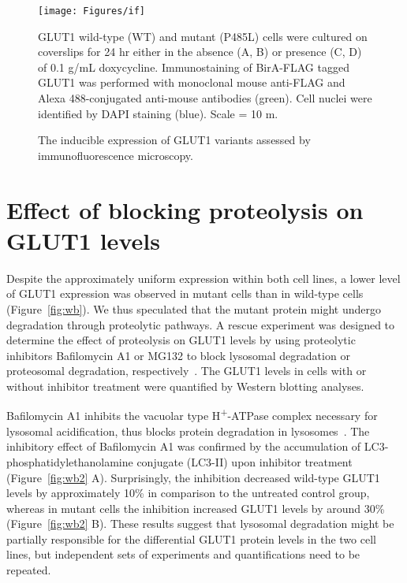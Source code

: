 \begin{figure}[h]
\centering
\texttt{[image: Figures/if]}
\caption{The inducible expression of GLUT1 variants assessed by immunofluorescence microscopy.}
\vspace*{-3mm}
\small \justify
GLUT1 wild-type (WT) and mutant (P485L) cells were cultured on coverslips for 24 hr either in the absence (A, B) or presence (C, D) of 0.1 {}\textmu g/mL doxycycline. Immunostaining of BirA-FLAG tagged GLUT1 was performed with monoclonal mouse anti-FLAG and Alexa 488-conjugated anti-mouse antibodies (green). Cell nuclei were identified by DAPI staining (blue). Scale = 10 \textmu m.
\label{fig:if}
\end{figure}

\section{Effect of blocking proteolysis on GLUT1 levels}
Despite the approximately uniform expression within both cell lines, a lower level of GLUT1 expression was observed in mutant cells than in wild-type cells (Figure~\ref{fig:wb}). We thus speculated that the mutant protein might undergo degradation through proteolytic pathways. A rescue experiment was designed to determine the effect of proteolysis on GLUT1 levels by using proteolytic inhibitors Bafilomycin A1 or MG132 to block lysosomal degradation or proteosomal degradation, respectively~\cite{Tanida,Lee.2}. The GLUT1 levels in cells with or without inhibitor treatment were quantified by Western blotting analyses.

Bafilomycin A1 inhibits the vacuolar type H\textsuperscript{+}-ATPase complex necessary for lysosomal acidification, thus blocks protein degradation in lysosomes~\cite{Yamamoto,Klionsky}. The inhibitory effect of Bafilomycin A1 was confirmed by the accumulation of LC3-phosphatidylethanolamine conjugate (LC3-II) upon inhibitor treatment (Figure~\ref{fig:wb2} A). Surprisingly, the inhibition decreased wild-type GLUT1 levels by approximately 10\% in comparison to the untreated control group, whereas in mutant cells the inhibition increased GLUT1 levels by around 30\% (Figure~\ref{fig:wb2} B). These results suggest that lysosomal degradation might be partially responsible for the differential GLUT1 protein levels in the two cell lines, but independent sets of experiments and quantifications need to be repeated.

